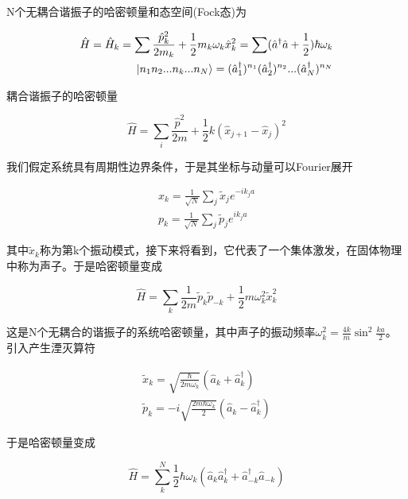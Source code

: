 N个无耦合谐振子的哈密顿量和态空间(Fock态)为

\begin{equation}
    \begin{split}
        \hat{H} = \hat{H}_k = \sum\frac{\hat{p}^2_k}{2m_k}+\frac{1}{2}m_k\omega_k\hat{x}_k^2 = \sum(\hat{a}^\dagger\hat{a}+\frac{1}{2})\hbar\omega_k \\
        \ket{n_1n_2...n_k...n_N}=(\hat{a}_1^\dagger)^{n_1}(\hat{a}_2^\dagger)^{n_2}...(\hat{a}_N^\dagger)^{n_N}
    \end{split}
\end{equation}

耦合谐振子的哈密顿量

\begin{equation}
	\hat{H}=\sum_{i}\frac{\hat{p}^2}{2m}+\frac{1}{2}k(\hat{x}_{j+1}-\hat{x}_j)^2
\end{equation}

我们假定系统具有周期性边界条件，于是其坐标与动量可以Fourier展开

\begin{equation}
	\begin{array}{lr}
		x_k=\frac{1}{\sqrt{N}}\sum_{j}\tilde{x}_je^{-ik_ja} \\
		p_k=\frac{1}{\sqrt{N}}\sum_{j}\tilde{p}_je^{ik_ja}
	\end{array}
\end{equation}

其中$\tilde{x}_k$称为第k个振动模式，接下来将看到，它代表了一个集体激发，在固体物理中称为声子。于是哈密顿量变成

\begin{equation}
	\hat{H}=\sum_{k}\frac{1}{2m}\tilde{p}_k\tilde{p}_{-k}+\frac{1}{2}m\omega_k^2\tilde{x}_k^2
\end{equation}

这是N个无耦合的谐振子的系统哈密顿量，其中声子的振动频率$\omega_k^2=\frac{4k}{m}\sin^2\frac{ka}{2}$。引入产生湮灭算符

\begin{equation}
	\begin{array}{lr}
		\tilde{x}_k=\sqrt{\frac{\hbar}{2m\omega_k}}(\hat{a}_k+\hat{a}_k^\dagger) \\
		\tilde{p}_k=-i\sqrt{\frac{2m\hbar\omega_k}{2}}(\hat{a}_k-\hat{a}_k^\dagger)
	\end{array}
\end{equation}

于是哈密顿量变成

\begin{equation}
	\hat{H}=\sum_{k}^N\frac{1}{2}\hbar\omega_k(\hat{a}_k\hat{a}_k^\dagger+\hat{a}_{-k}^\dagger\hat{a}_{-k})
\end{equation}

